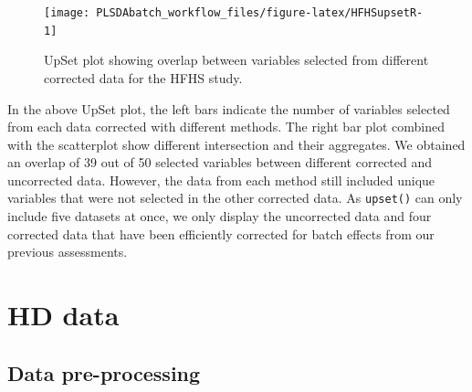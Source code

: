 \documentclass[
]{book}
\newenvironment{Shaded}{\begin{snugshade}}{\end{snugshade}}
\newcommand{\AttributeTok}[1]{\textcolor[rgb]{0.77,0.63,0.00}{#1}}
\newcommand{\ControlFlowTok}[1]{\textcolor[rgb]{0.13,0.29,0.53}{\textbf{#1}}}
\newcommand{\FunctionTok}[1]{\textcolor[rgb]{0.00,0.00,0.00}{#1}}
\newcommand{\NormalTok}[1]{#1}
\newcommand{\OtherTok}[1]{\textcolor[rgb]{0.56,0.35,0.01}{#1}}
\newcommand{\SpecialCharTok}[1]{\textcolor[rgb]{0.00,0.00,0.00}{#1}}
\newcommand{\StringTok}[1]{\textcolor[rgb]{0.31,0.60,0.02}{#1}}
\begin{document}
\begin{figure}

{\centering \texttt{[image: PLSDAbatch\_workflow\_files/figure-latex/HFHSupsetR-1]} 

}

\caption{UpSet plot showing overlap between variables selected from different corrected data for the HFHS study.}\label{fig:HFHSupsetR}
\end{figure}

In the above UpSet plot, the left bars indicate the number of variables selected from each data corrected with different methods. The right bar plot combined with the scatterplot show different intersection and their aggregates. We obtained an overlap of 39 out of 50 selected variables between different corrected and uncorrected data. However, the data from each method still included unique variables that were not selected in the other corrected data. As \texttt{upset()} can only include five datasets at once, we only display the uncorrected data and four corrected data that have been efficiently corrected for batch effects from our previous assessments.

\begin{Shaded}
\end{Shaded}

\hypertarget{hd-data}{%
\section{HD data}\label{hd-data}}

\hypertarget{data-pre-processing-3}{%
\subsection{Data pre-processing}\label{data-pre-processing-3}}
\end{document}
